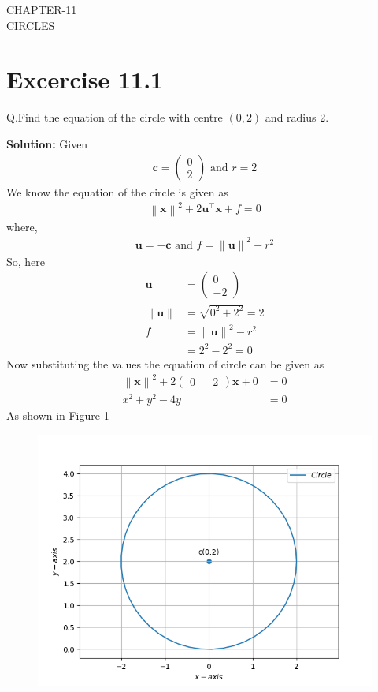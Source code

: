 \documentclass[12pt]{article}
\providecommand{\norm}[1]{\left\lVert#1\right\rVert}
\newcommand{\solution}{\noindent \textbf{Solution: }}
\newcommand{\myvec}[1]{\ensuremath{\begin{pmatrix}#1\end{pmatrix}}}
\let\vec\mathbf
\begin{document}
\begin{center}
\textbf\large{CHAPTER-11 \\ CIRCLES}

\end{center}
\section*{Excercise 11.1}

Q.Find the equation of the circle with centre $(0,2)$ and radius 2.

\solution
Given
\begin{align}
	\vec{c} = \myvec{0\\2} \text{ and } r = 2
\end{align}
We know the equation of the circle is given as
\begin{align}
	\norm{\vec{x}}^{2} + 2\vec{u}^{\top}\vec{x} + f = 0
\end{align}
where,
\begin{align}
	\vec{u} = -\vec{c} \text{ and } f = \norm{\vec{u}}^{2} - r^{2}
\end{align}
So, here
\begin{align}
	\vec{u} &= \myvec{0\\-2}\\
	\norm{\vec{u}} &= \sqrt{0^2 + 2^2} = 2\\
	f &= \norm{\vec{u}}^2 - r^2\\
	  &= 2^2 - 2^2 = 0
\end{align}
Now substituting the values the equation of circle can be given as
\begin{align}
	\norm{\vec{x}}^2 + 2\myvec{0 & -2}\vec{x} + 0 &= 0\\
	        		       x^2 + y^2 - 4y &= 0
\end{align}
As shown in Figure \ref{fig:Fig1}	
\begin{figure}[!h]
	\begin{center} 
	    \includegraphics[width=\columnwidth]{figs/circ1}
	\end{center}
\caption{}
\label{fig:Fig1}
\end{figure}
\end{document}
